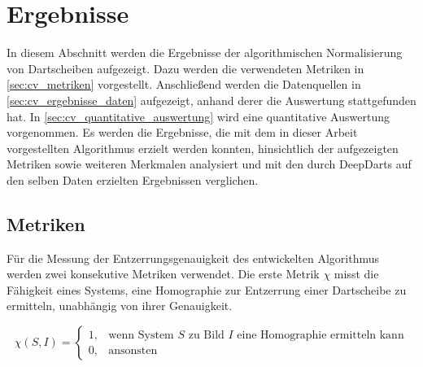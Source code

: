 
\section{Ergebnisse}
\label{sec:cv:ergebnisse}

In diesem Abschnitt werden die Ergebnisse der algorithmischen Normalisierung von Dartscheiben aufgezeigt. Dazu werden die verwendeten Metriken in \autoref{sec:cv_metriken} vorgestellt. Anschließend werden die Datenquellen in \autoref{sec:cv_ergebnisse_daten} aufgezeigt, anhand derer die Auswertung stattgefunden hat. In \autoref{sec:cv_quantitative_auswertung} wird eine quantitative Auswertung vorgenommen. Es werden die Ergebnisse, die mit dem in dieser Arbeit vorgestellten Algorithmus erzielt werden konnten, hinsichtlich der aufgezeigten Metriken sowie weiteren Merkmalen analysiert und mit den durch DeepDarts auf den selben Daten erzielten Ergebnissen verglichen.


\subsection{Metriken}
\label{sec:cv_metriken}

Für die Messung der Entzerrungsgenauigkeit des entwickelten Algorithmus werden zwei konsekutive Metriken verwendet. Die erste Metrik $\chi$ misst die Fähigkeit eines Systems, eine Homographie zur Entzerrung einer Dartscheibe zu ermitteln, unabhängig von ihrer Genauigkeit.

\begin{equation*}
    \chi(S, I) =
    \begin{cases}
        1, & \text{wenn System $S$ zu Bild $I$ eine Homographie ermitteln kann} \\
        0, & \text{ansonsten}
    \end{cases}
\end{equation*}

